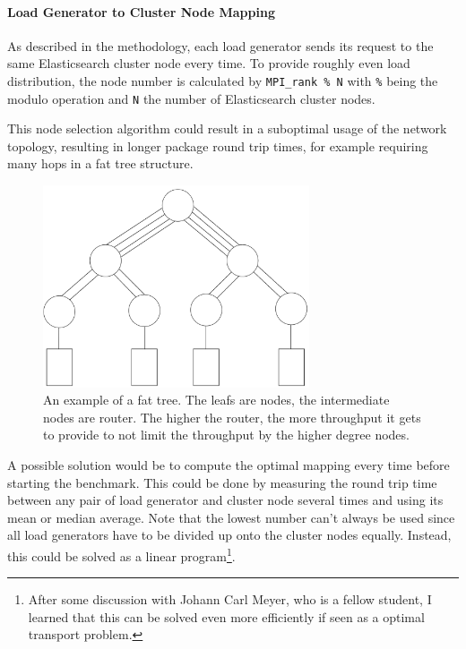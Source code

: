 \paragraph{Load Generator to Cluster Node Mapping} As described in the methodology, each load generator sends its request to the same Elasticsearch cluster node every time. To provide roughly even load distribution, the node number is calculated by \texttt{MPI\_rank \% N} with \texttt{\%} being the modulo operation and \texttt{N} the number of Elasticsearch cluster nodes.

This node selection algorithm could result in a suboptimal usage of the network topology, resulting in longer package round trip times, for example requiring many hops in a fat tree structure.\\

\begin{figure}[H]
  \centering
  \includegraphics[width=0.7\textwidth]{./assets/fattree.png}
  \caption{An example of a fat tree. The leafs are nodes, the intermediate nodes are router. The higher the router, the more throughput it gets to provide to not limit the throughput by the higher degree nodes.}
\end{figure}


A possible solution would be to compute the optimal mapping every time before starting the benchmark. This could be done by measuring the round trip time between any pair of load generator and cluster node several times and using its mean or median average. Note that the lowest number can't always be used since all load generators have to be divided up onto the cluster nodes equally. Instead, this could be solved as a linear program\footnote{After some discussion with Johann Carl Meyer, who is a fellow student, I learned that this can be solved even more efficiently if seen as a optimal transport problem.}.\\

